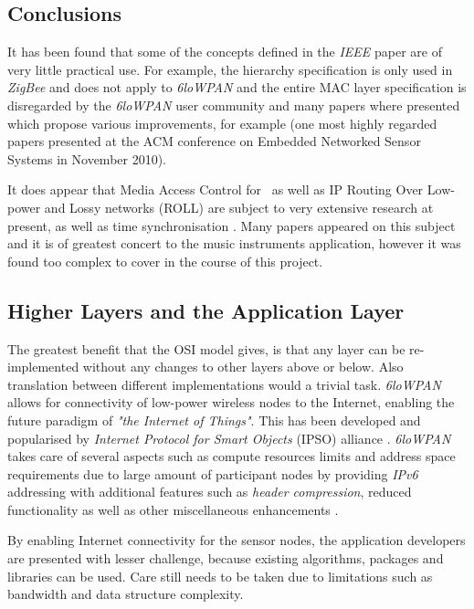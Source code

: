 \subsection{Conclusions}

  It has been found that some of the concepts defined in the \emph{IEEE}
 paper are of very little practical use. For example, the hierarchy
 specification is only used in \emph{ZigBee} and does not apply to
 \emph{6loWPAN} and the entire MAC layer specification is disregarded
 by the \emph{6loWPAN} user community and many papers where presented
 which propose various improvements, for example \cite{paper:amac}
 (one most highly regarded papers presented at the ACM conference
 on Embedded Networked Sensor Systems in November 2010).

 It does appear that Media Access Control for \WPAN\ as well as IP
 Routing Over Low-power and Lossy networks (ROLL) \cite{ietf:draft:roll}
 are subject to very extensive research at present, as well as time
 synchronisation \cite{paper:ts4,paper:ts2,paper:ts3,paper:ts1,
 Lenzen2010Clock, Lenzen2009Optimal, Sommer2009Gradient, Sommer2008Symmetric}.
 Many papers appeared on this subject and it is of greatest concert
 to the music instruments application, however it was found too complex
 to cover in the course of this project.



\subsection{Higher Layers and the Application Layer}

  The greatest benefit that the OSI model gives, is that any layer
 can be re-implemented without any changes to other layers above or
 below. Also translation between different implementations would a
 trivial task. \emph{6loWPAN} allows for connectivity of low-power
 wireless nodes to the Internet, enabling the future paradigm of
 \emph{"the Internet of Things"}. This has been developed and
 popularised by \emph{Internet Protocol for Smart Objects} (IPSO)
 alliance \cite{links:ipso:homepage}. \emph{6loWPAN} takes care of
 several aspects such as compute resources limits and address space
 requirements due to large amount of participant nodes by providing
 \emph{IPv6} addressing with additional features such as \emph{header
 compression}, reduced functionality as well as other miscellaneous
 enhancements \cite{pubs:ipso:wp3, pubs:ipso:wp1}.

  By enabling Internet connectivity for the sensor nodes, the application
 developers are presented with lesser challenge, because existing algorithms,
 packages and libraries can be used. Care still needs to be taken due
 to limitations such as bandwidth and data structure complexity.


